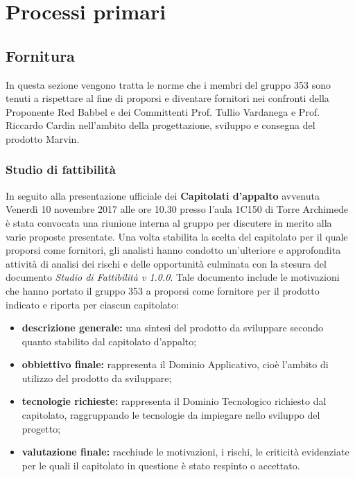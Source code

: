 \documentclass[NormeDiProgetto.tex]{subfiles}
\begin{document}
\chapter{Processi primari}

\section{Fornitura}
In questa sezione vengono tratta le norme che i membri del gruppo 353 sono tenuti a rispettare al fine di proporsi e diventare fornitori nei confronti della Proponente Red Babbel e dei Committenti Prof. Tullio Vardanega e Prof. Riccardo Cardin nell'ambito della progettazione, sviluppo e consegna del prodotto Marvin.
\subsection{Studio di fattibilità}
In seguito alla presentazione ufficiale dei \textbf{Capitolati d'appalto} avvenuta Venerdì 10 novembre 2017 alle ore 10.30 presso l'aula 1C150 di Torre Archimede è stata convocata una riunione interna al gruppo per discutere in merito alla varie proposte presentate. Una volta stabilita la scelta del capitolato per il quale proporsi come fornitori, gli analisti hanno condotto un'ulteriore e approfondita attività di analisi dei rischi e delle opportunità culminata con la stesura del documento \textit{Studio di Fattibilità v 1.0.0}. Tale documento include le motivazioni che hanno portato il gruppo 353 a proporsi come fornitore per il prodotto indicato e riporta per ciascun capitolato:
\begin{itemize}
	\item \textbf{descrizione generale:} una sintesi del prodotto da sviluppare secondo quanto stabilito dal capitolato d'appalto;
	\item \textbf{obbiettivo finale:} rappresenta il Dominio Applicativo, cioè l'ambito di utilizzo del prodotto da sviluppare;
	\item \textbf{tecnologie richieste:} rappresenta il Dominio Tecnologico richiesto dal capitolato, raggruppando le tecnologie da impiegare nello sviluppo del progetto;
	\item \textbf{valutazione finale:} racchiude le motivazioni, i rischi, le criticità evidenziate per le quali il capitolato in questione è stato respinto o accettato.
\end{itemize}
\end{document}
